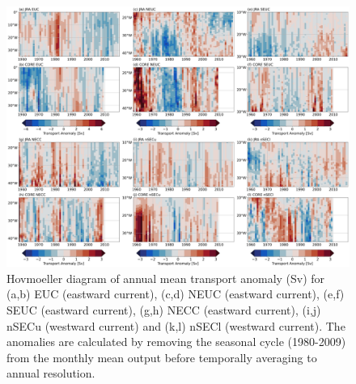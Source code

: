 \documentclass[os, manuscript]{copernicus}
\begin{document}
	\begin{figure}[t]
		\includegraphics[width=\linewidth]{../../figures/paper/f10_CURRENT_long_term.png}
		\caption{Hovmoeller diagram of annual mean transport anomaly (Sv) for (a,b) EUC (eastward current), (c,d) NEUC (eastward current), (e,f) SEUC (eastward current), (g,h) NECC (eastward current), (i,j) nSECu (westward current) and (k,l) nSECl (westward current). The anomalies are calculated by removing the seasonal cycle (1980-2009) from the monthly mean output before temporally averaging to annual resolution.}
		\label{fig_current_long_term}
	\end{figure} 
	
\end{document}
